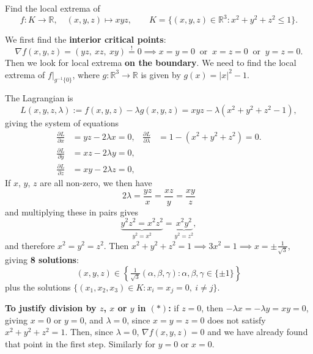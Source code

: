 \begin{example}
\label{ex:xyz_on_ball}
Find the local extrema of
\[f : K \to \mathbb{R}, \quad (x,y,z) \mapsto xyz, \qquad K = \{(x,y,z) \in \mathbb{R}^3 : x^2+y^2+z^2 \leq 1\}.\]

\medskip
We first find the \textbf{interior critical points}:
\[\nabla f(x,y,z) = (yz,\ xz,\ xy) \overset{!}{=} 0 \implies x = y = 0 \ \text{ or } \ x = z = 0 \ \text{ or } \ y = z = 0.\]
Then we look for local extrema \textbf{on the boundary}. We need to find the local extrema of
$f|_{g^{-1}\{0\}}$, where $g : \mathbb{R}^3\to\mathbb{R}$ is given by $g(x) = |x|^2 - 1$.

The Lagrangian is
\[L(x,y,z,\lambda) := f(x,y,z) - \lambda g(x,y,z) = xyz - \lambda(x^2+y^2+z^2-1),\]
giving the system of equations
\[
\begin{aligned}
\frac{\partial L}{\partial x} &= yz - 2\lambda x = 0, & \frac{\partial L}{\partial \lambda} &= 1 - (x^2+y^2+z^2) = 0. \\
\frac{\partial L}{\partial y} &= xz - 2\lambda y = 0, \\
\frac{\partial L}{\partial z} &= xy - 2\lambda z = 0,
\end{aligned}
\]
If $x$, $y$, $z$ are all non-zero, we then have
\begin{equation*}
2\lambda = \frac{yz}{x} = \frac{xz}{y} = \frac{xy}{z} \tag{$*$}
\end{equation*}
and multiplying these in pairs gives
\[\underbrace{y^2z^2 = x^2z^2}_{y^2 = x^2} = \underbrace{x^2y^2}_{y^2 = z^2},\]
and therefore $x^2 = y^2 = z^2$.
Then $x^2+y^2+z^2 = 1 \implies 3x^2 = 1 \implies x = \pm\frac{1}{\sqrt{3}}$, giving
\textbf{8 solutions}:
\[(x,y,z) \in \left\{\tfrac{1}{\sqrt{3}}(\alpha,\beta,\gamma) : \alpha,\beta,\gamma \in \{\pm 1\}\right\}\]
plus the solutions $\{(x_1,x_2,x_3) \in K : x_i = x_j = 0,\ i \neq j\}$.

\textbf{To justify division by $z$, $x$ or $y$ in $(*)$:} if $z = 0$, then
$-\lambda x = -\lambda y = xy = 0$, giving $x = 0$ or $y = 0$, and $\lambda = 0$, since
$x = y = z = 0$ does not satisfy $x^2+y^2+z^2 = 1$. Then, since $\lambda = 0$,
$\nabla f(x,y,z) = 0$ and we have already found that point in the first step. Similarly for
$y = 0$ or $x = 0$.


\end{example}
